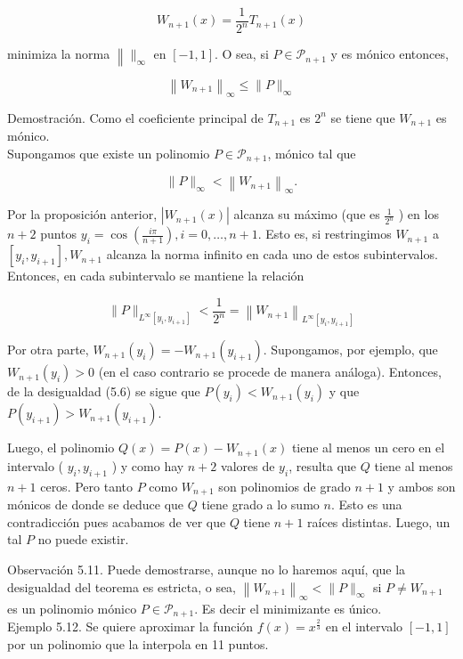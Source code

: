 \documentclass[10pt]{article}
\begin{document}
$$
W_{n+1}(x)=\frac{1}{2^{n}} T_{n+1}(x)
$$

minimiza la norma $\left\|\|_{\infty}\right.$ en $[-1,1]$. O sea, si $P \in \mathcal{P}_{n+1}$ y es mónico entonces,

$$
\left\|W_{n+1}\right\|_{\infty} \leq\|P\|_{\infty}
$$

Demostración. Como el coeficiente principal de $T_{n+1}$ es $2^{n}$ se tiene que $W_{n+1}$ es mónico.\\
Supongamos que existe un polinomio $P \in \mathcal{P}_{n+1}$, mónico tal que

$$
\|P\|_{\infty}<\left\|W_{n+1}\right\|_{\infty} .
$$

Por la proposición anterior, $\left|W_{n+1}(x)\right|$ alcanza su máximo (que es $\frac{1}{2^{n}}$ ) en los $n+2$ puntos $y_{i}=\cos \left(\frac{i \pi}{n+1}\right), i=0, \ldots, n+1$. Esto es, si restringimos $W_{n+1}$ a $\left[y_{i}, y_{i+1}\right], W_{n+1}$ alcanza la norma infinito en cada uno de estos subintervalos. Entonces, en cada subintervalo se mantiene la relación


\begin{equation*}
\|P\|_{L^{\infty}\left[y_{i}, y_{i+1}\right]}<\frac{1}{2^{n}}=\left\|W_{n+1}\right\|_{L^{\infty}\left[y_{i}, y_{i+1}\right]} \tag{5.6}
\end{equation*}


Por otra parte, $W_{n+1}\left(y_{i}\right)=-W_{n+1}\left(y_{i+1}\right)$. Supongamos, por ejemplo, que $W_{n+1}\left(y_{i}\right)>0$ (en el caso contrario se procede de manera análoga). Entonces, de la desigualdad (5.6) se sigue que $P\left(y_{i}\right)<W_{n+1}\left(y_{i}\right)$ y que $P\left(y_{i+1}\right)>W_{n+1}\left(y_{i+1}\right)$.

Luego, el polinomio $Q(x)=P(x)-W_{n+1}(x)$ tiene al menos un cero en el intervalo ( $y_{i}, y_{i+1}$ ) y como hay $n+2$ valores de $y_{i}$, resulta que $Q$ tiene al menos $n+1$ ceros. Pero tanto $P$ como $W_{n+1}$ son polinomios de grado $n+1$ y ambos son mónicos de donde se deduce que $Q$ tiene grado a lo sumo $n$. Esto es una contradicción pues acabamos de ver que $Q$ tiene $n+1$ raíces distintas. Luego, un tal $P$ no puede existir.

Observación 5.11. Puede demostrarse, aunque no lo haremos aquí, que la desigualdad del teorema es estricta, o sea, $\left\|W_{n+1}\right\|_{\infty}<\|P\|_{\infty}$ si $P \neq W_{n+1}$ es un polinomio mónico $P \in \mathcal{P}_{n+1}$. Es decir el minimizante es único.\\
Ejemplo 5.12. Se quiere aproximar la función $f(x)=x^{\frac{2}{3}}$ en el intervalo $[-1,1]$ por un polinomio que la interpola en 11 puntos.
\end{document}
